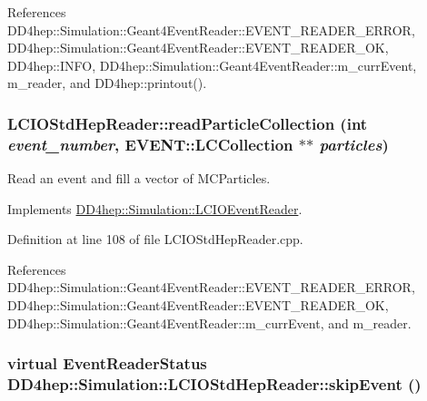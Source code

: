 References DD4hep::Simulation::Geant4EventReader::EVENT\_\-READER\_\-ERROR, DD4hep::Simulation::Geant4EventReader::EVENT\_\-READER\_\-OK, DD4hep::INFO, DD4hep::Simulation::Geant4EventReader::m\_\-currEvent, m\_\-reader, and DD4hep::printout().\hypertarget{class_d_d4hep_1_1_simulation_1_1_l_c_i_o_std_hep_reader_ab358476ce7a1bab27504d2bfe4b8b630}{
\subsubsection[{readParticleCollection}]{ LCIOStdHepReader::readParticleCollection (int {\em event\_\-number}, \/  EVENT::LCCollection $\ast$$\ast$ {\em particles})}}
\label{class_d_d4hep_1_1_simulation_1_1_l_c_i_o_std_hep_reader_ab358476ce7a1bab27504d2bfe4b8b630}


Read an event and fill a vector of MCParticles. 

Implements \hyperlink{class_d_d4hep_1_1_simulation_1_1_l_c_i_o_event_reader_a49acaafd98bbd6a954b29cfd9465d017}{DD4hep::Simulation::LCIOEventReader}.

Definition at line 108 of file LCIOStdHepReader.cpp.

References DD4hep::Simulation::Geant4EventReader::EVENT\_\-READER\_\-ERROR, DD4hep::Simulation::Geant4EventReader::EVENT\_\-READER\_\-OK, DD4hep::Simulation::Geant4EventReader::m\_\-currEvent, and m\_\-reader.\hypertarget{class_d_d4hep_1_1_simulation_1_1_l_c_i_o_std_hep_reader_a54ae13b39268486b6edc4a7f9a11ada3}{
\subsubsection[{skipEvent}]{\setlength{\rightskip}{0pt plus 5cm}virtual {\bf EventReaderStatus} DD4hep::Simulation::LCIOStdHepReader::skipEvent ()}}
\label{class_d_d4hep_1_1_simulation_1_1_l_c_i_o_std_hep_reader_a54ae13b39268486b6edc4a7f9a11ada3}



